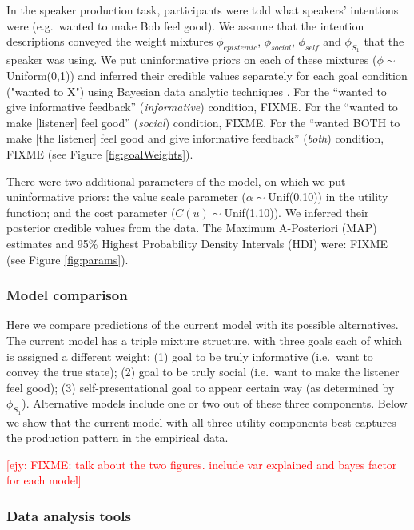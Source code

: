 \documentclass[12pt]{article}
\newcommand{\ejy}[1]{\textcolor{Red}{[ejy: #1]}}
\begin{document}
In the speaker production task, participants were told what speakers' intentions were 
(e.g.~wanted to make Bob feel good). 
We assume that the intention descriptions conveyed the weight mixtures $\phi_{epistemic}$, $\phi_{social}$, $\phi_{self}$ and $\phi_{S_1}$ that the speaker was using. 
We put uninformative priors on each of these mixtures ($\phi \sim$ Uniform(0,1)) 
and inferred their credible values separately for each goal condition ("wanted to X") 
using Bayesian data analytic techniques \cite{lee2014}. 
For the \enquote{wanted to give informative feedback} (\emph{informative}) condition, FIXME. 
For the \enquote{wanted to make [listener] feel good} (\emph{social}) condition, FIXME. 
For the \enquote{wanted BOTH to make [the listener] feel good and give informative feedback} (\emph{both}) condition, FIXME (see Figure \ref{fig:goalWeights}). 

There were two additional parameters of the model, on which we put uninformative priors: the value scale parameter ($\alpha \sim $Unif(0,10)) in the utility function; and the cost parameter ($C(u) \sim $Unif(1,10)). We inferred their posterior credible values from the data. The Maximum A-Posteriori (MAP) estimates and 95\% Highest Probability Density Intervals (HDI) were: FIXME (see Figure \ref{fig:params}).

\subsubsection*{Model comparison}

Here we compare predictions of the current model with its possible
alternatives. The current model has a triple mixture structure, with
three goals each of which is assigned a different weight: (1) goal to be
truly informative (i.e.~want to convey the true state); (2) goal to be
truly social (i.e.~want to make the listener feel good); (3)
self-presentational goal to appear certain way (as determined by
$\phi_{S_1} $). Alternative models include one or two out of these three
components. Below we show that the current model with all three utility components
best captures the production pattern in the empirical data.

\ejy{FIXME: talk about the two figures. include var explained and bayes factor for each model}

\subsubsection*{Data analysis tools}
\end{document}
